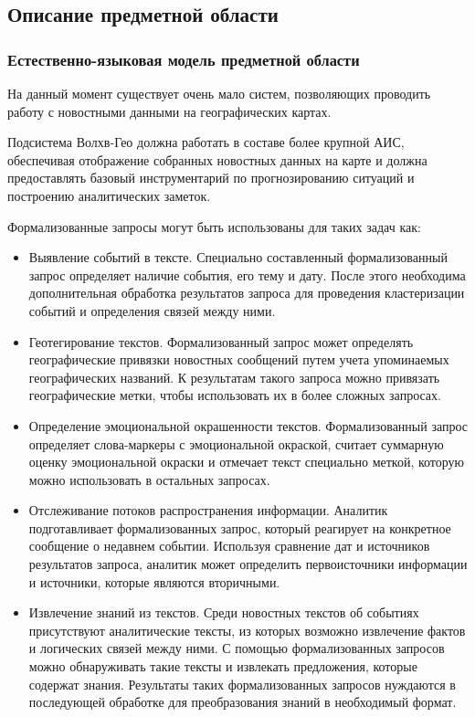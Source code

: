 \clearpage
\subsection{Описание предметной области}
\subsubsection{Естественно-языковая модель предметной области}

На данный момент существует очень мало систем, позволяющих проводить работу с новостными данными на географических картах.

Подсистема Волхв-Гео должна работать в составе более крупной АИС, обеспечивая отображение собранных новостных данных на карте и должна предоставлять базовый инструментарий по прогнозированию ситуаций и построению аналитических заметок.

Формализованные запросы могут быть использованы для таких задач как:
\begin{itemize}
\item Выявление событий в тексте. Специально составленный формализованный запрос определяет наличие события, его тему и дату. После этого необходима дополнительная обработка результатов запроса для проведения кластеризации событий и определения связей между ними.
\item Геотегирование текстов. Формализованный запрос может определять географические привязки новостных сообщений путем учета упоминаемых географических названий. К результатам такого запроса можно привязать географические метки, чтобы использовать их в более сложных запросах.
\item Определение эмоциональной окрашенности текстов. Формализованный запрос определяет слова-маркеры с эмоциональной окраской, считает суммарную оценку эмоциональной окраски и отмечает текст специально меткой, которую можно использовать в остальных запросах.
\item Отслеживание потоков распространения информации. Аналитик подготавливает формализованных запрос, который реагирует на конкретное сообщение о недавнем событии. Используя сравнение дат и источников результатов запроса, аналитик может определить первоисточники информации и источники, которые являются вторичными. 
\item Извлечение знаний из текстов. Среди новостных текстов об событиях присутствуют аналитические тексты, из которых возможно извлечение фактов и логических связей между ними. С помощью формализованных запросов можно обнаруживать такие тексты и извлекать предложения, которые содержат знания. Результаты таких формализованных запросов нуждаются в последующей обработке для преобразования знаний в необходимый формат.
\end{itemize}

